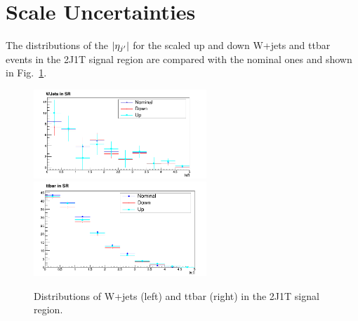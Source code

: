 \section{Scale Uncertainties}
\label{app:scaleuncs}
The distributions of the $|\eta_{j^\prime}|$ for the scaled up and down W+jets and ttbar events in the 2J1T signal region are compared with the nominal ones and shown in Fig.~\ref{fig:scaledUnc}.
\begin{figure}[hbpt]
\begin{center}
\includegraphics[width=6.5cm]{figures/wjets_nominal_up_down.png}
\includegraphics[width=6.5cm]{figures/ttbar_nominal_up_down.png}\hfill
\caption{\label{fig:scaledUnc} Distributions of W+jets (left) and ttbar (right) in the 2J1T signal region.}
\end{center}
\end{figure}
